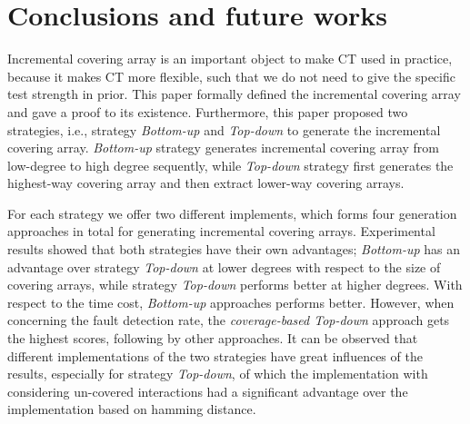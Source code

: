\documentclass[conference]{IEEEtran}
\theoremstyle{definition}
\begin{document}
\section{Conclusions and future works}
Incremental covering array is an important object to make CT used in practice, because it makes CT more flexible, such that we do not need to give the specific test strength in prior. This paper formally defined the incremental covering array and gave a proof to its existence. Furthermore, this paper proposed two strategies, i.e., strategy \emph{Bottom-up} and \emph{Top-down} to generate the incremental covering array. \emph{Bottom-up} strategy generates incremental covering array from low-degree to high degree sequently, while \emph{Top-down} strategy first generates the highest-way covering array and then extract lower-way covering arrays.

For each strategy we offer two different implements, which forms four generation approaches in total for generating incremental covering arrays. Experimental results showed that both strategies have their own advantages; \emph{Bottom-up} has an advantage over strategy \emph{Top-down} at lower degrees with respect to the size of covering arrays, while strategy \emph{Top-down} performs better at higher degrees. With respect to the time cost, \emph{Bottom-up} approaches performs better. However, when concerning the fault detection rate, the \emph{coverage-based Top-down} approach gets the highest scores, following by other approaches. It can be observed that different implementations of the two strategies have great influences of the results, especially for strategy \emph{Top-down}, of which the implementation with considering un-covered interactions had a significant advantage over the implementation based on hamming distance.

\end{document}
